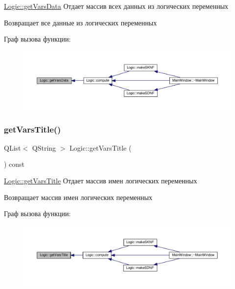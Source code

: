 \hyperlink{class_logic_a42630bbe8bded25027014e9f0b2a085e}{Logic\+::get\+Vars\+Data} Отдает массив всех данных из логических переменных 

\begin{DoxyReturn}{Возвращает}
все данные из логических переменных 
\end{DoxyReturn}
Граф вызова функции\+:\nopagebreak
\begin{figure}[H]
\begin{center}
\leavevmode
\includegraphics[width=350pt]{class_logic_a42630bbe8bded25027014e9f0b2a085e_icgraph}
\end{center}
\end{figure}
\mbox{\label{class_logic_a0887d38c17058d50c4d8a3b7a8fc44ac}} 
\subsubsection{\texorpdfstring{get\+Vars\+Title()}{getVarsTitle()}}
{\footnotesize\ttfamily Q\+List$<$ Q\+String $>$ Logic\+::get\+Vars\+Title (\begin{DoxyParamCaption}{ }\end{DoxyParamCaption}) const}



\hyperlink{class_logic_a0887d38c17058d50c4d8a3b7a8fc44ac}{Logic\+::get\+Vars\+Title} Отдает массив имен логических переменных 

\begin{DoxyReturn}{Возвращает}
массив имен логических переменных 
\end{DoxyReturn}
Граф вызова функции\+:\nopagebreak
\begin{figure}[H]
\begin{center}
\leavevmode
\includegraphics[width=350pt]{class_logic_a0887d38c17058d50c4d8a3b7a8fc44ac_icgraph}
\end{center}
\end{figure}
\mbox{\label{class_logic_a1494325c8d91b7fe5728b7dbdf82fca3}} 
